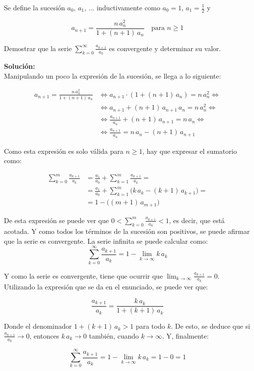 \documentclass[../../main.tex]{subfiles}
\begin{document}
\begin{shaded}
Se define la sucesión $a_0$, $a_1$, ... inductivamente como $a_0 = 1$, $a_1 = \frac{1}{2}$ y

$$
a_{n + 1} = \frac{n \, a_n^2}{1 + (n + 1) \, a_n} \quad \text{para } n \geq 1
$$

Demostrar que la serie $\displaystyle\sum_{k = 0}^\infty \frac{a_{k + 1}}{a_k}$ es convergente y determinar su valor.
\end{shaded}

\textbf{Solución:}
\\

Manipulando un poco la expresión de la sucesión, se llega a lo siguiente:

\begin{equation*}
\begin{split}
a_{n + 1} = \frac{n \, a_n^2}{1 + (n + 1) \, a_n} & \iff
a_{n + 1} \cdot (1 + (n + 1) \, a_n) = n \, a_n^2 \iff \\ & \iff
a_{n + 1} + (n + 1) \, a_{n + 1} \, a_n = n \, a_n^2 \iff \\ & \iff
\frac{a_{n + 1}}{a_n} + (n + 1) \, a_{n + 1} = n \, a_n \iff \\ & \iff
\frac{a_{n + 1}}{a_n} = n \, a_n - (n + 1) \, a_{n + 1}
\end{split}
\end{equation*}

Como esta expresión es solo válida para $n \geq 1$, hay que expresar el sumatorio como:

\begin{equation*}
\begin{split}
\sum_{k = 0}^m \frac{a_{k + 1}}{a_k} & =
\frac{a_1}{a_0} + \sum_{k = 1}^m \frac{a_{k + 1}}{a_k} =  \\ & =
\frac{a_1}{a_0} + \sum_{k = 1}^m \big(k \, a_k - (k + 1) \, a_{k + 1}\big) =  \\ & =
1 - \big((m + 1) \, a_{m + 1}\big)
\end{split}
\end{equation*}

De esta expresión se puede ver que $0 < \displaystyle\sum_{k = 0}^m \frac{a_{k + 1}}{a_k} < 1$, es decir, que está acotada. Y como todos los términos de la sucesión son positivos, se puede afirmar que la serie es convergente. La serie infinita se puede calcular como:
\\

$$
\sum_{k = 0}^\infty \frac{a_{k + 1}}{a_k} = 1 - \lim_{k \to \infty} k \, a_k
$$

Y como la serie es convergente, tiene que ocurrir que $\displaystyle\lim_{k \to \infty} \frac{a_{k + 1}}{a_k} = 0$. Utilizando la expresión que se da en el enunciado, se puede ver que:

$$
\frac{a_{k + 1}}{a_k} = \frac{k \, a_k}{1 + (k + 1) \, a_k}
$$

Donde el denominador $1 + (k + 1) \, a_k > 1$ para todo $k$. De esto, se deduce que si $\displaystyle\frac{a_{k + 1}}{a_k} \to 0$, entonces $k \, a_k \to 0$ también, cuando $k \to \infty$. Y, finalmente:

$$
\sum_{k = 0}^\infty \frac{a_{k + 1}}{a_k} = 1 - \lim_{k \to \infty} k \, a_k = 1 - 0 = 1
$$
\end{document}
